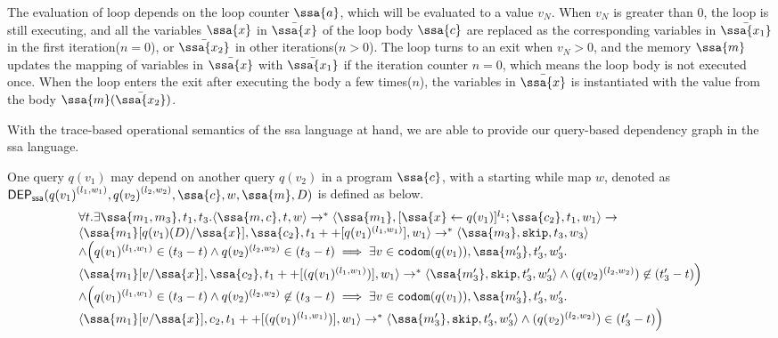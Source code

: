 The evaluation of loop depends on the loop counter $\ssa{\aexpr}$, which will be evaluated to a value $v_N$. When $v_N$ is greater than 0, the loop is still executing, and all the variables $\ssa{x}$ in $\bar{\ssa{x}}$ of the loop body $\ssa{c}$ are replaced as the corresponding variables in $\bar{\ssa{x_1}}$ in the first iteration($n=0$), or $\bar{\ssa{x_2}}$ in other iterations($n > 0$). The loop turns to an exit when $v_N > 0$, and the memory $\ssa{m}$ updates the mapping of variables in $\bar{\ssa{x}}$ with $\bar{\ssa{x_1}}$ if the iteration counter $n=0$, which means the loop body is not executed once. When the loop enters the exit after executing the body a few times($n$), the variables in $\bar{\ssa{x}}$ is instantiated with the value from the body $\ssa{m}(\bar{\ssa{x_2}})$. 

With the trace-based operational semantics of the ssa language at hand, we are able to provide our query-based dependency graph in the ssa language.

\begin{defn}
One query ${q(v_1)}$ may depend on another query ${q(v_2)}$ in a program $\ssa{c}$, with a starting while map $w$, denoted as
$\mathsf{DEP_{ssa}}({q(v_1)}^{(l_1, w_1)}, {q(v_2)}^{(l_2, w_2)}, \ssa{c},w, \ssa{m},D)$ is defined as below. 
\[
  \begin{array}{l}
     \forall t. \exists \ssa{m_1,m_3},t_1,t_3. 
\config{\ssa{m, c},  t,w} \rightarrow^{*} \config{\ssa{m_1}, [\assign{\ssa{x}}{q(v_1)}]^{l_1} ; \ssa{c_2},
  t_1,w_1} \rightarrow \\ \config{\ssa{m_1}[q(v_1)(D)/\ssa{x}], \ssa{c_2},
  t_1++[q(v_1)^{(l_1, w_1)}], w_1} \rightarrow^{*} \config{\ssa{m_3}, \eskip,
  t_3,w_3} \\  
  \land 
\Big( q(v_1)^{(l_1,w_1)} \in (t_3-t) \land q(v_2)^{(l_2,w_2)} \in (t_3-t) \implies  \exists v \in \codom(q(v_1)),\ssa{m_3'}, t_3', w_3'. \\
 \config{\ssa{m_1}[v/\ssa{x}], \ssa{c_2}, t_1++[(q(v_1)^{(l_1,w_1)})], w_1} \rightarrow^{*} \config{\ssa{m_3'}, \eskip, t_3', w_3'} \land (q(v_2)^{(l_2,w_2)}) \not \in (t_3'-t)
\Big)\\
\land 
\Big(q(v_1)^{(l_1,w_1)} \in (t_3-t) \land q(v_2)^{(l_2,w_2)} \not\in (t_3-t) \implies  \exists v \in \codom(q(v_1)),\ssa{m_3'}, t_3', w_3'. \\
 \config{\ssa{m_1}[v/\ssa{x}], {c_2}, t_1++[(q(v_1)^{(l_1,w_1)})], w_1} \rightarrow^{*} \config{\ssa{m_3'}, \eskip, t_3', w_3'} \land (q(v_2)^{(l_2,w_2)})  \in (t_3'-t)
\Big)\\
\end{array}
\]
\end{defn}




